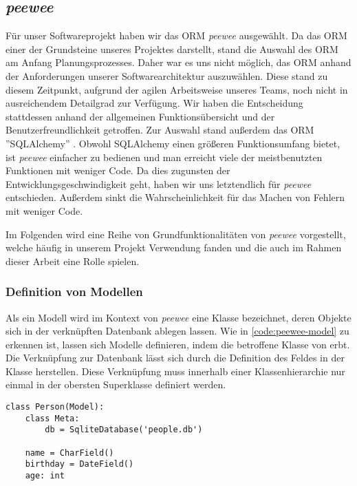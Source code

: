 \subsection{\emph{peewee}}
Für unser Softwareprojekt haben wir das ORM \emph{peewee} \cite{leifer_coleiferpeewee_2023} ausgewählt. Da das ORM einer der Grundsteine unseres Projektes darstellt, stand die Auswahl des ORM am Anfang Planungsprozesses. Daher war es uns nicht möglich, das ORM  anhand der Anforderungen unserer Softwarearchitektur auszuwählen. Diese stand zu diesem Zeitpunkt, aufgrund der agilen Arbeitsweise unseres Teams, noch nicht in ausreichendem Detailgrad zur Verfügung. Wir haben die Entscheidung stattdessen anhand der allgemeinen Funktionsübersicht und der Benutzerfreundlichkeit getroffen. Zur Auswahl stand außerdem das ORM ''SQLAlchemy'' \cite{noauthor_sqlalchemy_2023}. Obwohl SQLAlchemy einen größeren Funktionsumfang bietet, ist \emph{peewee} einfacher zu bedienen und man erreicht viele der meistbenutzten Funktionen mit weniger Code. Da dies zugunsten der Entwicklungsgeschwindigkeit geht, haben wir uns letztendlich für \emph{peewee} entschieden. Außerdem sinkt die Wahrscheinlichkeit für das Machen von Fehlern mit weniger Code.

Im Folgenden wird eine Reihe von Grundfunktionalitäten von \emph{peewee} vorgestellt, welche häufig in unserem Projekt Verwendung fanden und die auch im Rahmen dieser Arbeit eine Rolle spielen.

\subsubsection*{Definition von Modellen}

Als ein Modell wird im Kontext von \emph{peewee} eine Klasse bezeichnet, deren Objekte sich in der verknüpften Datenbank ablegen lassen. Wie in \autoref{code:peewee-model} zu erkennen ist, lassen sich Modelle definieren, indem die betroffene Klasse von  erbt. Die Verknüpfung zur Datenbank lässt sich durch die Definition des Feldes  in der Klasse  herstellen. Diese Verknüpfung muss innerhalb einer Klassenhierarchie nur einmal in der obersten Superklasse definiert werden.

\lstset{language=python}
\begin{lstlisting}[caption={Python-Code zur Definition eines \emph{peewee}-Modells. Es modelliert eine Person mit einem Namen und einem Geburtstag. Weiterhin besitzt die Klasse das nicht-persistente Feld \code{age}. \cite{noauthor_quickstart_2023}}, label=code:peewee-model]
class Person(Model):
    class Meta:
        db = SqliteDatabase('people.db')

    name = CharField()
    birthday = DateField()
    age: int
\end{lstlisting}

